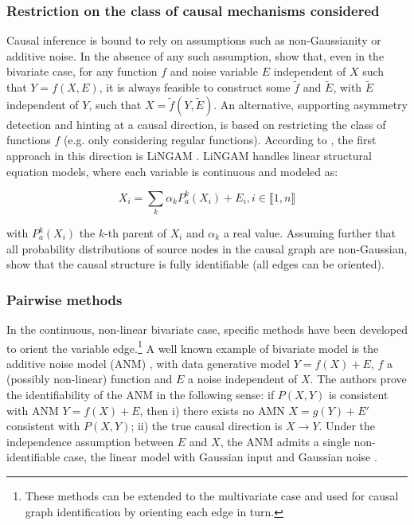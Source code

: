 \documentclass[a4paper, 11pt]{article}
\begin{document}
\subsubsection{Restriction on the class of causal mechanisms considered}

Causal inference is bound to rely on assumptions such as non-Gaussianity or additive noise. In the absence of any such assumption, \cite{zhang2016estimation}  show that, even in the bivariate case, for any function $f$ and noise variable $E$ independent of $X$ such that $Y = f(X,E)$, it is always feasible to construct some $\tilde{f}$ and  $\tilde{E}$, with $\tilde{E}$ independent of $Y$, such that $X = \tilde{f}(Y,\tilde{E})$. 
An alternative, supporting asymmetry detection and hinting at a causal direction, is based on restricting the class of functions $f$ (e.g. only considering regular functions). According to \cite{quinn2011learning}, the first approach in this direction is LiNGAM  \citep{shimizu2006linear}. LiNGAM handles linear structural equation models, where each variable is continuous and modeled as:

\begin{equation}
X_i = \sum_k \alpha_k P_a^{k}(X_i) + E_i,  i \in \llbracket 1,n \rrbracket
\label{SEM}
\end{equation}

with  $P_a^{k}(X_i)$ the $k$-th parent of $X_i$ and $\alpha_k$ a real value.
Assuming further that all probability distributions of source nodes in the causal graph are non-Gaussian, \cite{shimizu2006linear} show that the causal structure is fully identifiable (all edges can be oriented).


\subsubsection{Pairwise methods} 

In the continuous, non-linear bivariate case, specific methods have been developed to orient the variable edge.\footnote{These methods can be extended to the multivariate case and used for causal graph identification by orienting each edge in turn.}
A well known example of bivariate model is the additive noise model (ANM) \citep{hoyer2009nonlinear}, with data generative model  $Y = f(X) + E$, $f$ a (possibly non-linear) function and $E$ a noise independent of $X$. The authors prove the identifiability of the ANM in the following sense: if $P(X,Y)$ is consistent with ANM $Y = f(X) + E$, then i) there exists no AMN $X = g(Y) + E'$ consistent with $P(X,Y)$; ii) the true causal direction is $X \rightarrow Y$. Under the independence assumption between $E$ and $X$, the ANM admits a single non-identifiable case, the linear model with Gaussian input and Gaussian noise \citep{mooij2016distinguishing}.
\end{document}
